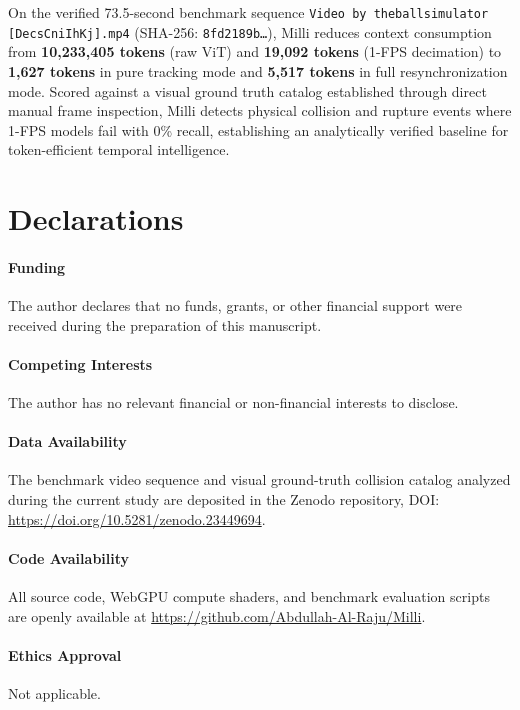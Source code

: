 \documentclass[11pt]{article}
\begin{document}
On the verified 73.5-second benchmark sequence \nolinkurl{Video by theballsimulator [DecsCniIhKj].mp4} (SHA-256: \texttt{8fd2189b\dots}), Milli reduces context consumption from \textbf{10,233,405 tokens} (raw ViT) and \textbf{19,092 tokens} (1-FPS decimation) to \textbf{1,627 tokens} in pure tracking mode and \textbf{5,517 tokens} in full resynchronization mode. Scored against a visual ground truth catalog established through direct manual frame inspection, Milli detects physical collision and rupture events where 1-FPS models fail with 0\% recall, establishing an analytically verified baseline for token-efficient temporal intelligence.

\section*{Declarations}

\paragraph{Funding}
The author declares that no funds, grants, or other financial support were received during the preparation of this manuscript.

\paragraph{Competing Interests}
The author has no relevant financial or non-financial interests to disclose.

\paragraph{Data Availability}
The benchmark video sequence and visual ground-truth collision catalog analyzed during the current study are deposited in the Zenodo repository, DOI: \url{https://doi.org/10.5281/zenodo.23449694}.

\paragraph{Code Availability}
All source code, WebGPU compute shaders, and benchmark evaluation scripts are openly available at \url{https://github.com/Abdullah-Al-Raju/Milli}.

\paragraph{Ethics Approval}
Not applicable.
\end{document}
